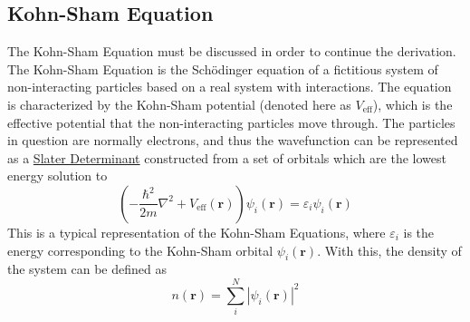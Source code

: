 \documentclass[12pt]{article}
\newcommand{\lrp}[1]{\left( #1 \right)}
\begin{document}
\subsection{Kohn-Sham Equation} %
The Kohn-Sham Equation must be discussed in order to continue the derivation. The Kohn-Sham Equation is the Sch\"odinger equation of a fictitious system of non-interacting particles based on a real system with interactions. The equation is characterized by the Kohn-Sham potential (denoted here as $V_{\mathrm{eff}}$), which is the effective potential that the non-interacting particles move through. The particles in question are normally electrons, and thus the wavefunction can be represented as a \href{https://en.wikipedia.org/wiki/Slater_determinant}{Slater Determinant} constructed from a set of orbitals which are the lowest energy solution to 
\begin{equation}\label{eq:KSeq}
    \lrp{-\frac{\hbar^2}{2m}\nabla^2+ V_{\mathrm{eff}}(\textbf{r})}\psi_i(\textbf{r}) = \varepsilon_i\psi_i(\textbf{r})
\end{equation}
This is a typical representation of the Kohn-Sham Equations, where $\varepsilon_i$ is the energy corresponding to the Kohn-Sham orbital $\psi_i(\textbf{r})$. With this, the density of the system can be defined as 
\begin{equation*}
    n(\textbf{r}) = \sum_i^N |\psi_i(\textbf{r})|^2
\end{equation*}
\end{document}
